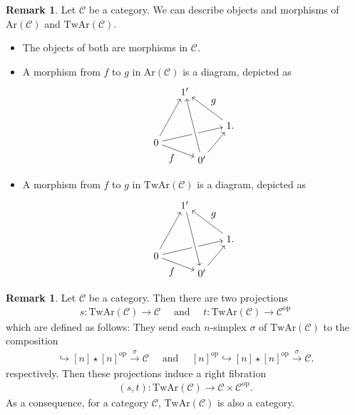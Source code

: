 \documentclass[a4paper,dvipdfmx,11pt,reqno]{amsart}
\DeclareMathOperator{\myop}{op}
\newcommand{\C}{\mathcal{C}}
\newcommand{\Cat}{\mathrm{Cat}}
\newcommand{\Ar}{\mathrm{Ar}}
\newcommand{\TwAr}{\mathrm{TwAr}}
\theoremstyle{definition}
\newtheorem{remark}[theorem]{Remark}
\begin{document}
\begin{remark} \label{Ber.rem.3.2}
  Let $\C$ be a category.
  We can describe objects and morphisms of $\Ar(\C)$ and $\TwAr(\C)$.
  \begin{itemize}
    \item The objects of both are morphisms in $\C$.
    \item A morphism from $f$ to $g$ in $\Ar(\C)$ is a diagram, depicted as 
    \[\begin{tikzpicture}[auto]
      \node (0) at (0,0) {$0$};
      \node (1) at (1.6,-0.6) {$0'$};
      \node (2) at (2.6,0.6) {$1.$};
      \node (3) at (1,1.8) {$1'$};
      \draw[->] (0) -- node[swap] {$f$} (1);
      \draw[->] (0) -- node {} (2);
      \draw[->] (0) -- node {} (3);
      \draw[->] (1) -- node {} (2);
      \draw[-, line width=6pt,draw=white] (1) -- node {} (3);
      \draw[->] (1) -- node {} (3);
      \draw[->] (2) -- node[swap] {$g$} (3);
    \end{tikzpicture}\]
    \item A morphism from $f$ to $g$ in $\TwAr(\C)$ is a diagram, depicted as 
    \[\begin{tikzpicture}[auto]
      \node (0) at (0,0) {$0$};
      \node (1) at (1.6,-0.6) {$0'$};
      \node (2) at (2.6,0.6) {$1.$};
      \node (3) at (1,1.8) {$1'$};
      \draw[->] (0) -- node[swap] {$f$} (1);
      \draw[->] (0) -- node {} (2);
      \draw[->] (0) -- node {} (3);
      \draw[->] (1) -- node {} (2);
      \draw[-, line width=6pt,draw=white] (1) -- node {} (3);
      \draw[->] (3) -- node {} (1);
      \draw[->] (2) -- node[swap] {$g$} (3);
    \end{tikzpicture}\]
  \end{itemize}
\end{remark}


\begin{remark}
  Let $\C$ be a category.
  Then there are two projections
  \begin{align*}
    s : \TwAr(\C) \to \C
    \quad \text{ and } \quad
    t : \TwAr(\C) \to \C^{\myop} 
  \end{align*}
  which are defined as follows:
  They send each $n$-simplex $\sigma$ of $\TwAr(\C)$ to the composition
  \begin{align*}
    [n] \hookrightarrow [n] \star [n]^{\myop} \xrightarrow{\sigma} \C
    \quad \text{ and } \quad
    [n]^{\myop} \hookrightarrow [n] \star [n]^{\myop} \xrightarrow{\sigma} \C.
  \end{align*}
  respectively.
  Then these projections induce a right fibration 
  \begin{align*}
    (s,t) : \TwAr(\C) \to \C \times \C^{\myop}.
  \end{align*}
  As a consequence, for a category $\C$, $\TwAr(\C)$ is also a category.
\end{remark}
\end{document}
